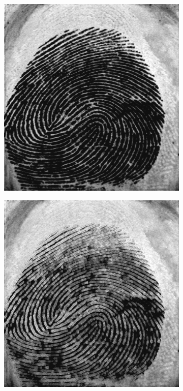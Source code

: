 \documentclass{beamer}
\begin{document}
{\begin{figure}[!ht]
\begin{subfigure}[ht]{0.15\textwidth}
        \end{subfigure}
    \end{figure}
    \begin{figure}[!ht]
        \centering
        \begin{subfigure}[ht]{0.15\textwidth}
            \includegraphics[width=\textwidth]{fingerprints/2000Db3a/1_3_src.jpg}
        \end{subfigure}
        \qquad
        \begin{subfigure}[ht]{0.15\textwidth}
            \includegraphics[width=\textwidth]{fingerprints/2000Db3a/1_3_background.jpg}

\end{subfigure}
\end{figure}}
\end{document}
